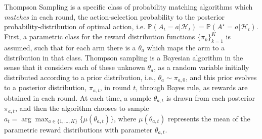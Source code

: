 \documentclass[10pt]{article}
\newtheorem{fact}[thm]{Fact}
\def\E{\mathbb{E}}
\newcommand{\Prob}{\mathbb{P}}
\begin{document}
Thompson Sampling is a specific class of probability matching algorithms which \textit{matches} in each round, the action-selection probability  to the posterior probability-distribution of optimal action, i.e. $\Prob(A_{t} = a|\mathcal{H}_{t})=\Prob(A^\star=a|\mathcal{H}_{t})$.  First, a parametric class for the reward distribution functions $\{\pi_k\}_{k=1}^K$ is assumed, such that for each arm there is a $\theta_{a}$ which maps the arm to a distribution in that class.  Thompson sampling is a Bayesian algorithm in the sense that it considers each of these unknown $\theta_{a}$, as a random variable initially distributed according to a prior distribution, i.e.,  $\theta_a \sim \pi_{a,0}$, and this prior evolves to a  posterior distribution, $\pi_{a,t}$, in round $t$, through Bayes rule, as rewards are obtained in each round. At each time, a sample $\theta_{a,t}$ is drawn from each posterior $\pi_{a,t}$, and then the algorithm chooses to sample  $a_t=\arg \max_{a\in\{1,\dots,K\}}\{\mu(\theta_{a,t})\}$, where $\mu(\theta_{a,t})$ represents the mean of the  parametric reward distributions with parameter $\theta_{a,t}$. 







\end{document}
